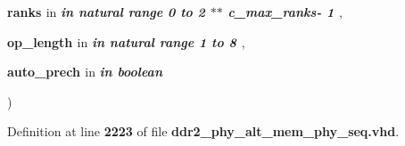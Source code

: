 {\begin{DoxyParamCaption}
\item[{}]{{\bfseries \textcolor{vhdlchar}{ranks}\textcolor{vhdlchar}{ }}\textcolor{stringliteral}{in} {\em {\bfseries \textcolor{keywordflow}{in}\textcolor{vhdlchar}{ }\textcolor{comment}{natural}\textcolor{vhdlchar}{ }\textcolor{vhdlchar}{ }\textcolor{vhdlchar}{ }\textcolor{keywordflow}{range}\textcolor{vhdlchar}{ }\textcolor{vhdlchar}{ } \textcolor{vhdldigit}{0} \textcolor{vhdlchar}{ }\textcolor{keywordflow}{to}\textcolor{vhdlchar}{ }\textcolor{vhdlchar}{ } \textcolor{vhdldigit}{2} \textcolor{vhdlchar}{$\ast$}\textcolor{vhdlchar}{$\ast$}\textcolor{vhdlchar}{ }\textcolor{vhdlchar}{ }\textcolor{vhdlchar}{ }\textcolor{vhdlchar}{c\+\_\+max\+\_\+ranks}\textcolor{vhdlchar}{-\/}\textcolor{vhdlchar}{ } \textcolor{vhdldigit}{1} \textcolor{vhdlchar}{ }}} , }
\item[{}]{{\bfseries \textcolor{vhdlchar}{op\+\_\+length}\textcolor{vhdlchar}{ }}\textcolor{stringliteral}{in} {\em {\bfseries \textcolor{keywordflow}{in}\textcolor{vhdlchar}{ }\textcolor{comment}{natural}\textcolor{vhdlchar}{ }\textcolor{vhdlchar}{ }\textcolor{vhdlchar}{ }\textcolor{keywordflow}{range}\textcolor{vhdlchar}{ }\textcolor{vhdlchar}{ } \textcolor{vhdldigit}{1} \textcolor{vhdlchar}{ }\textcolor{keywordflow}{to}\textcolor{vhdlchar}{ }\textcolor{vhdlchar}{ } \textcolor{vhdldigit}{8} \textcolor{vhdlchar}{ }}} , }
\item[{}]{{\bfseries \textcolor{vhdlchar}{auto\+\_\+prech}\textcolor{vhdlchar}{ }}\textcolor{stringliteral}{in} {\em {\bfseries \textcolor{keywordflow}{in}\textcolor{vhdlchar}{ }\textcolor{comment}{boolean}\textcolor{vhdlchar}{ }\textcolor{vhdlchar}{ }\textcolor{vhdlchar}{ }}}}
\end{DoxyParamCaption}
)\hspace{0.3cm}{\ttfamily [Function]}}\label{class__ddr2__phy__alt__mem__phy__addr__cmd__pkg_a4581caa3ecedf520ed11be28a4caad6e}


Definition at line {\bf 2223} of file {\bf ddr2\+\_\+phy\+\_\+alt\+\_\+mem\+\_\+phy\+\_\+seq.\+vhd}.

